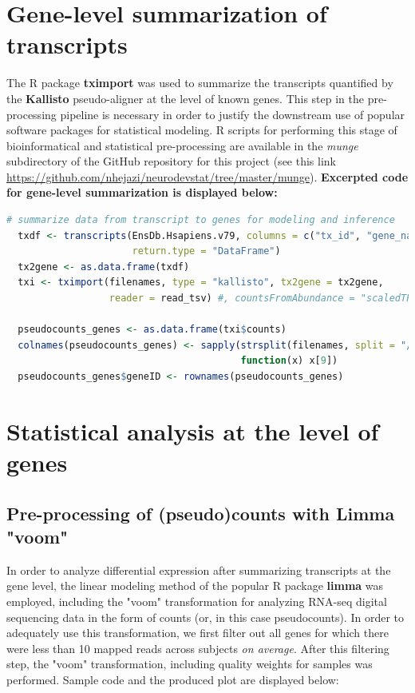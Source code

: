 \documentclass[11pt]{article}
\begin{document}
\section{Gene-level summarization of transcripts}
The R package \textbf{tximport} was used to summarize the transcripts
quantified by the \textbf{Kallisto} pseudo-aligner at the level of known genes.
This step in the pre-processing pipeline is necessary in order to justify the
downstream use of popular software packages for statistical modeling. R scripts
for performing this stage of bioinformatical and statistical pre-processing are
available in the \textit{munge} subdirectory of the GitHub repository for this
project (see this link
\url{https://github.com/nhejazi/neurodevstat/tree/master/munge}).
\textbf{Excerpted code for gene-level summarization is displayed below:}

\begin{lstlisting}[language=R]
  # summarize data from transcript to genes for modeling and inference
  txdf <- transcripts(EnsDb.Hsapiens.v79, columns = c("tx_id", "gene_name"),
                      return.type = "DataFrame")
  tx2gene <- as.data.frame(txdf)
  txi <- tximport(filenames, type = "kallisto", tx2gene = tx2gene,
                  reader = read_tsv) #, countsFromAbundance = "scaledTPM")

  pseudocounts_genes <- as.data.frame(txi$counts)
  colnames(pseudocounts_genes) <- sapply(strsplit(filenames, split = "/"),
                                         function(x) x[9])
  pseudocounts_genes$geneID <- rownames(pseudocounts_genes)
\end{lstlisting}


\section{Statistical analysis at the level of genes}

\subsection{Pre-processing of (pseudo)counts with Limma "voom"}
In order to analyze differential expression after summarizing transcripts at the
gene level, the linear modeling method of the popular R package \textbf{limma}
was employed, including the "voom" transformation for analyzing RNA-seq digital
sequencing data in the form of counts (or, in this case pseudocounts). In order
to adequately use this transformation, we first filter out all genes for which
there were less than 10 mapped reads across subjects \textit{on average}. After
this filtering step, the "voom" transformation, including quality weights for
samples was performed.  Sample code and the produced plot are displayed below:
\end{document}
